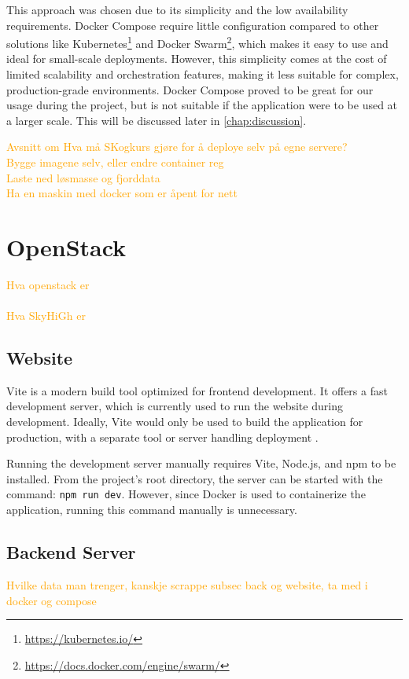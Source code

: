 This approach was chosen due to its simplicity and the low availability requirements. Docker Compose require little configuration compared to other solutions like Kubernetes\footnote{\url{https://kubernetes.io/}} and Docker Swarm\footnote{\url{https://docs.docker.com/engine/swarm/}}, which makes it easy to use and ideal for small-scale deployments. However, this simplicity comes at the cost of limited scalability and orchestration features, making it less suitable for complex, production-grade environments. Docker Compose proved to be great for our usage during the project, but is not suitable if the application were to be used at a larger scale. This will be discussed later in \autoref{chap:discussion}.

\textcolor{orange}{
Avsnitt om Hva må SKogkurs gjøre for å deploye selv på egne servere? \\
Bygge imagene selv, eller endre container reg \\
Laste ned løsmasse og fjorddata \\
Ha en maskin med docker som er åpent for nett
}


\section{OpenStack}\label{sec:deployment:openstack}

\textcolor{orange}{
Hva openstack er \\ \\
Hva SkyHiGh er
}

\subsection{Website}\label{subsec:deployment:docker:website}

Vite is a modern build tool optimized for frontend development. It offers a fast development server, which is currently used to run the website during development. Ideally, Vite would only be used to build the application for production, with a separate tool or server handling deployment \cite{vite}.

Running the development server manually requires Vite, Node.js, and npm to be installed. From the project's root directory, the server can be started with the command: \texttt{npm run dev}. However, since Docker is used to containerize the application, running this command manually is unnecessary.

\subsection{Backend Server}\label{subsec:deployment:docker:backendserver}

\textcolor{orange}{Hvilke data man trenger, kanskje scrappe subsec back og website, ta med i docker og compose}
